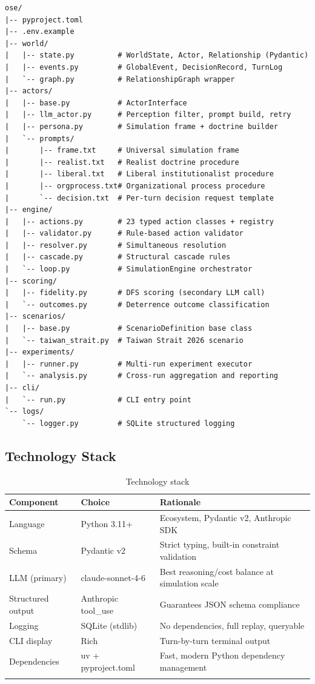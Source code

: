\documentclass[12pt, a4paper]{article}
\begin{document}
\begin{verbatim}
ose/
|-- pyproject.toml
|-- .env.example
|-- world/
|   |-- state.py          # WorldState, Actor, Relationship (Pydantic)
|   |-- events.py         # GlobalEvent, DecisionRecord, TurnLog
|   `-- graph.py          # RelationshipGraph wrapper
|-- actors/
|   |-- base.py           # ActorInterface
|   |-- llm_actor.py      # Perception filter, prompt build, retry
|   |-- persona.py        # Simulation frame + doctrine builder
|   `-- prompts/
|       |-- frame.txt     # Universal simulation frame
|       |-- realist.txt   # Realist doctrine procedure
|       |-- liberal.txt   # Liberal institutionalist procedure
|       |-- orgprocess.txt# Organizational process procedure
|       `-- decision.txt  # Per-turn decision request template
|-- engine/
|   |-- actions.py        # 23 typed action classes + registry
|   |-- validator.py      # Rule-based action validator
|   |-- resolver.py       # Simultaneous resolution
|   |-- cascade.py        # Structural cascade rules
|   `-- loop.py           # SimulationEngine orchestrator
|-- scoring/
|   |-- fidelity.py       # DFS scoring (secondary LLM call)
|   `-- outcomes.py       # Deterrence outcome classification
|-- scenarios/
|   |-- base.py           # ScenarioDefinition base class
|   `-- taiwan_strait.py  # Taiwan Strait 2026 scenario
|-- experiments/
|   |-- runner.py         # Multi-run experiment executor
|   `-- analysis.py       # Cross-run aggregation and reporting
|-- cli/
|   `-- run.py            # CLI entry point
`-- logs/
    `-- logger.py         # SQLite structured logging
\end{verbatim}

\subsection{Technology Stack}

\begin{longtable}{p{3cm} p{3.5cm} p{6cm}}
\toprule
\textbf{Component} & \textbf{Choice} & \textbf{Rationale} \\
\midrule
Language & Python 3.11+ & Ecosystem, Pydantic v2, Anthropic SDK \\
Schema & Pydantic v2 & Strict typing, built-in constraint validation \\
LLM (primary) & claude-sonnet-4-6 & Best reasoning/cost balance at simulation scale \\
Structured output & Anthropic tool\_use & Guarantees JSON schema compliance \\
Logging & SQLite (stdlib) & No dependencies, full replay, queryable \\
CLI display & Rich & Turn-by-turn terminal output \\
Dependencies & uv + pyproject.toml & Fast, modern Python dependency management \\
\bottomrule
\caption{Technology stack}
\end{longtable}
\end{document}
